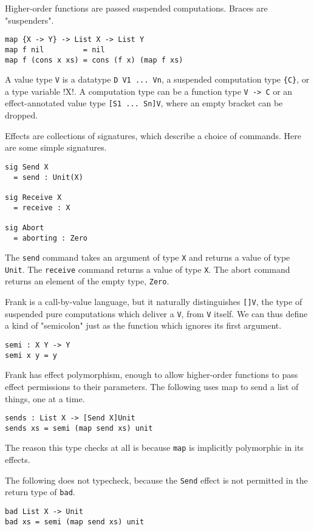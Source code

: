 \documentclass[preprint]{sigplanconf}
\begin{document}
Higher-order functions are passed suspended computations. Braces are
"suspenders".
%
\begin{verbatim}
map {X -> Y} -> List X -> List Y
map f nil         = nil
map f (cons x xs) = cons (f x) (map f xs)
\end{verbatim}

A value type \verb!V! is a datatype \verb!D V1 ... Vn!, a suspended
computation type \verb!{C}!, or a type variable !X!.
%
A computation type can be a function type \verb!V -> C! or an
effect-annotated value type \verb![S1 ... Sn]V!, where an empty
bracket can be dropped.

Effects are collections of signatures, which describe a choice of
commands. Here are some simple signatures.
%
\begin{verbatim}
sig Send X
  = send : Unit(X)

sig Receive X
  = receive : X

sig Abort
  = aborting : Zero
\end{verbatim}
%
The \verb!send! command takes an argument of type \verb!X! and returns
a value of type \verb!Unit!. The \verb!receive! command returns a
value of type \verb!X!. The abort command returns an element of the
empty type, \verb!Zero!.

Frank is a call-by-value language, but it naturally distinguishes
\verb![]V!, the type of suspended pure computations which deliver a
\verb!V!, from \verb!V! itself. We can thus define a kind of
"semicolon" just as the function which ignores its first argument.
%
\begin{verbatim}
semi : X Y -> Y
semi x y = y
\end{verbatim}

Frank has effect polymorphism, enough to allow higher-order functions
to pass effect permissions to their parameters. The following uses map
to send a list of things, one at a time.
%
\begin{verbatim}
sends : List X -> [Send X]Unit
sends xs = semi (map send xs) unit
\end{verbatim}
%
The reason this type checks at all is because \verb!map! is implicitly
polymorphic in its effects.

The following does not typecheck, because the \verb!Send! effect is
not permitted in the return type of \verb!bad!.

\begin{verbatim}
bad List X -> Unit
bad xs = semi (map send xs) unit
\end{verbatim}
\end{document}

